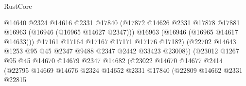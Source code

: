 \begin{lexlean}{RustCore}
\begin{coremodule}
                                          @14640
                                          @2324
                                          @14616
                                          @2331
                                          @17840
                                          (@17872
                                            @14626
                                            @2331
                                            @17878
                                            @17881
                                            @16963
                                            (@16946 (@16965 @14627 @2347)))
                                          @16963
                                          (@16946 (@16965 @14617 @14633)))
                                        @17161
                                        @17164
                                        @17167
                                        @17171
                                        @17176
                                        @17182)
                                      (@22702
                                        @14643
                                        @1253
                                        @95
                                        @45
                                        @2347
                                        @9488
                                        @2347
                                        @2442
                                        @33423
                                        @23008))
                                    (@23012
                                      @1267
                                      @95
                                      @45
                                      @14670
                                      @14679
                                      @2347
                                      @14682
                                      (@23022
                                        @14670
                                        @14677
                                        @2414
                                        (@22795
                                          @14669
                                          @14676
                                          @2324
                                          @14652
                                          @2331
                                          @17840
                                          (@22809
                                            @14662
                                            @2331
                                            @22815

\end{coremodule}
\end{lexlean}
